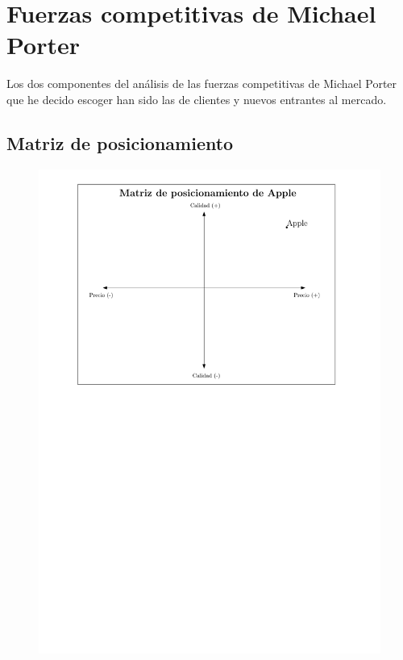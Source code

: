 \documentclass{article}
\begin{document}
\section{Fuerzas competitivas de Michael Porter}
Los dos componentes del análisis de las fuerzas competitivas de Michael Porter que he decido escoger han sido las de clientes y nuevos entrantes al mercado.


\subsection{Matriz de posicionamiento}
\begin{figure}[H]
    \centering
    \includegraphics[]{figs/MatrixApple.pdf} 
\end{figure}
\end{document}
